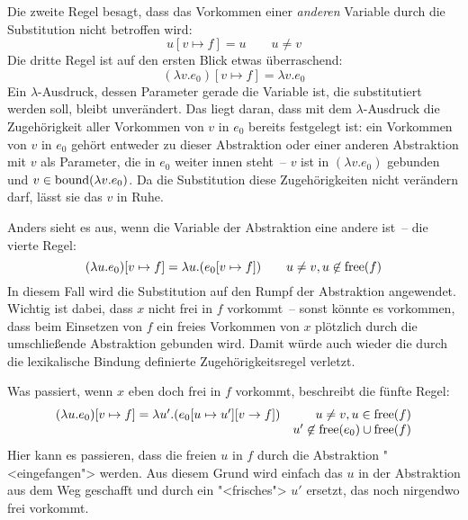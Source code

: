 %
Die zweite Regel besagt, dass das Vorkommen einer \emph{anderen}
Variable durch die Substitution nicht betroffen wird:
%
\begin{displaymath}
    u[v\mapsto f] = u \qquad u\neq v
\end{displaymath}
%
Die dritte Regel ist auf den ersten Blick etwas überraschend:
%
\begin{displaymath}
    (\lambda v.e_0)[v\mapsto f] = \lambda v.e_0
\end{displaymath}
%
Ein $\lambda$-Ausdruck, dessen Parameter gerade die Variable ist, die
substitutiert werden soll, bleibt unverändert.  Das liegt daran, dass
mit dem $\lambda$-Ausdruck die Zugehörigkeit aller Vorkommen von $v$
in $e_0$ bereits festgelegt ist: ein Vorkommen von $v$ in $e_0$ gehört
entweder zu dieser Abstraktion oder einer anderen Abstraktion mit $v$
als Parameter, die in $e_0$ weiter innen steht~-- $v$ ist in $(\lambda
v.e_0)$ gebunden und $v\in\operatorname{bound}(\lambda v.e_0)$.
Da die Substitution diese Zugehörigkeiten nicht verändern darf, lässt
sie das $v$ in Ruhe.

Anders sieht es aus, wenn die Variable der Abstraktion eine andere
ist~-- die vierte Regel:
%
\begin{displaymath}
  (\lambda u.e_0)[v\mapsto f]  = \lambda u.(e_0[v\mapsto f])
  \qquad u\neq v, u\not\in\operatorname{free}(f)
\end{displaymath}
%
In diesem Fall wird die Substitution auf den Rumpf der Abstraktion
angewendet.  Wichtig ist dabei, dass $x$ nicht frei in $f$ vorkommt~-- sonst
könnte es vorkommen, dass beim Einsetzen von $f$ ein freies Vorkommen
von $x$ plötzlich durch die umschließende Abstraktion gebunden wird.
Damit würde auch wieder die durch die lexikalische Bindung definierte
Zugehörigkeitsregel verletzt.

Was passiert, wenn $x$ eben doch frei in $f$ vorkommt, beschreibt die
fünfte Regel:
%
\begin{displaymath}
  \begin{array}{lr}
      (\lambda u.e_0)[v\mapsto f] = \lambda u'.(e_0[u\mapsto u'][v\rightarrow f])
    & u\neq v, u\in\operatorname{free}(f)\\& u'\not\in\operatorname{free}(e_0)\cup\operatorname{free}(f)
  \end{array}
\end{displaymath}
%
Hier kann es passieren, dass die freien $u$ in $f$ durch die
Abstraktion "<eingefangen"> werden.  Aus diesem Grund wird einfach das
$u$ in der Abstraktion aus dem Weg geschafft und durch ein
"<frisches"> $u'$ ersetzt, das noch nirgendwo frei vorkommt.

